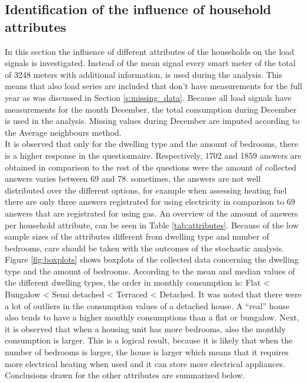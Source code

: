 \subsection{Identification of the influence of household attributes} \label{s:Identification of driving attributes}
In this section the influence of different attributes of the households on the load signals is investigated. Instead of the mean signal every smart meter of the total of 3248 meters with additional information, is used during the analysis. This means that also load series are included that don't have measurements for the full year as was discussed in Section \ref{s:missing_data}. Because all load signals have measurements for the month December, the total consumption during December is used in the analysis. Missing values during December are imputed according to the Average neighbours method.\\
It is observed that only for the dwelling type and the amount of bedrooms, there is a higher response in the questionnaire. Respectively, 1702 and 1859 answers are obtained in comparison to the rest of the questions were the amount of collected answers varies between 69 and 78. sometimes, the answers are not well distributed over the different options, for example when assessing heating fuel there are only three answers registrated for using electricity in comparison to 69 answers that are registrated for using gas. An overview of the amount of answers per household attribute, can be seen in Table \ref{tab:attributes}. Because of the low sample sizes of the attributes different from dwelling type and number of bedrooms, care should be taken with the outcomes of the stochastic analysis.\\
Figure \ref{fig:boxplots} shows boxplots of the collected data concerning the dwelling type and the amount of bedrooms. According to the mean and median values of the different dwelling types, the order in monthly consumption is: Flat < Bungalow < Semi detached < Terraced < Detached. It was noted that there were a lot of outliers in the consumption values of a detached house. A ``real'' house also tends to have a higher monthly consumptions than a flat or bungalow. Next, it is observed that when a housing unit has more bedrooms, also the monthly consumption is larger. This is a logical result, because it is likely that when the number of bedrooms is larger, the house is larger which means that it requires more electrical heating when used and it can store more electrical appliances. Conclusions drawn for the other attributes are summarized below.

